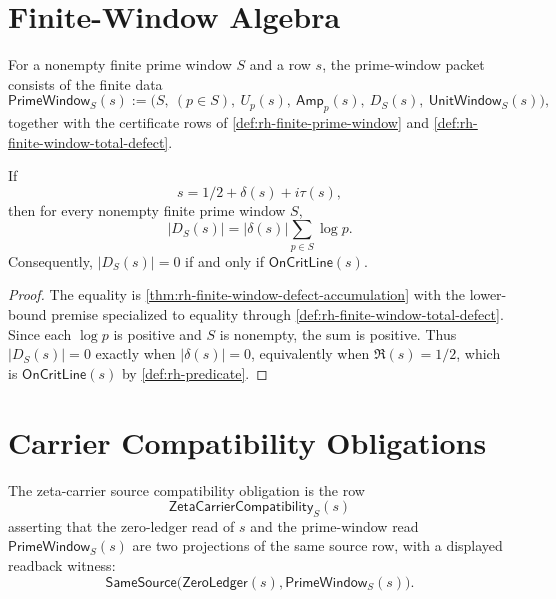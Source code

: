 \section{Finite-Window Algebra}
\label{sec:rh-local-global-finite-window-algebra}

\begin{definition}
\label{def:rh-prime-window-packet}
For a nonempty finite prime window $S$ and a row $s$, the prime-window
packet consists of the finite data
$$
\mathsf{PrimeWindow}_{S}(s)
:=
\bigl(
S,\ (p\in S),\ U_p(s),\ \mathsf{Amp}_p(s),\ D_S(s),\
\mathsf{UnitWindow}_{S}(s)
\bigr),
$$
together with the certificate rows of
\autoref{def:rh-finite-prime-window} and
\autoref{def:rh-finite-window-total-defect}.
\end{definition}

\begin{theorem}
\label{thm:rh-prime-window-defect-formula}
If
$$
s=1/2+\delta(s)+i\tau(s),
$$
then for every nonempty finite prime window $S$,
$$
|D_S(s)|
=
|\delta(s)|\sum_{p\in S}\log p.
$$
Consequently, $|D_S(s)|=0$ if and only if $\mathsf{OnCritLine}(s)$.
\end{theorem}

\begin{proof}
The equality is \autoref{thm:rh-finite-window-defect-accumulation} with
the lower-bound premise specialized to equality through
\autoref{def:rh-finite-window-total-defect}. Since each $\log p$ is
positive and $S$ is nonempty, the sum is positive. Thus $|D_S(s)|=0$
exactly when $|\delta(s)|=0$, equivalently when $\Re(s)=1/2$, which is
$\mathsf{OnCritLine}(s)$ by \autoref{def:rh-predicate}.
\end{proof}

\section{Carrier Compatibility Obligations}
\label{sec:rh-local-global-carrier-compatibility-obligations}

\begin{definition}
\label{def:rh-zeta-carrier-source-compatibility}
The zeta-carrier source compatibility obligation is the row
$$
\mathsf{ZetaCarrierCompatibility}_{S}(s)
$$
asserting that the zero-ledger read of $s$ and the prime-window read
$\mathsf{PrimeWindow}_{S}(s)$ are two projections of the same source row,
with a displayed readback witness:
$$
\mathsf{SameSource}
\bigl(
\mathsf{ZeroLedger}(s),
\mathsf{PrimeWindow}_{S}(s)
\bigr).
$$
\end{definition}

